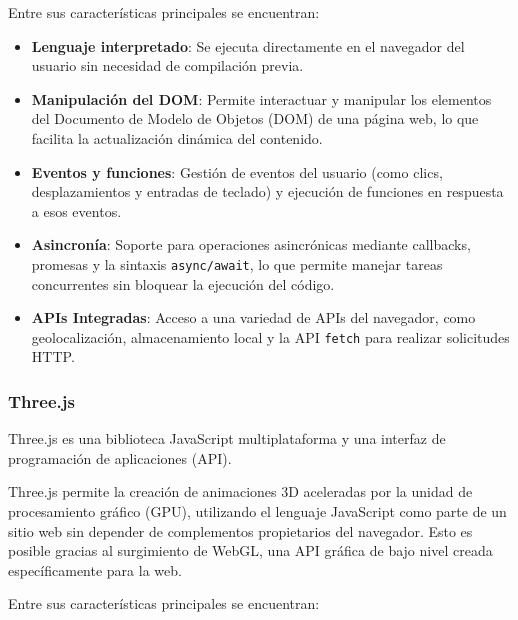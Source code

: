 \documentclass[a4paper, 12pt]{book}
\begin{document}
        Entre sus características principales se encuentran:
        \begin{itemize}
            \item \textbf{Lenguaje interpretado}: Se ejecuta directamente en el navegador del usuario sin necesidad de compilación previa.
            \item \textbf{Manipulación del DOM}: Permite interactuar y manipular los elementos del Documento de Modelo de Objetos (DOM) de una página web, lo que facilita la actualización dinámica del contenido.
            \item \textbf{Eventos y funciones}: Gestión de eventos del usuario (como clics, desplazamientos y entradas de teclado) y ejecución de funciones en respuesta a esos eventos.
            \item \textbf{Asincronía}: Soporte para operaciones asincrónicas mediante callbacks, promesas y la sintaxis \texttt{async/await}, lo que permite manejar tareas concurrentes sin bloquear la ejecución del código.
            \item \textbf{APIs Integradas}: Acceso a una variedad de APIs del navegador, como geolocalización, almacenamiento local y la API \texttt{fetch} para realizar solicitudes HTTP.
        \end{itemize}

        \subsubsection{Three.js}
        Three.js\cite{ThreeJS,dirksen2013learning,} es una biblioteca JavaScript multiplataforma y una interfaz de programación de aplicaciones (API).
        
        Three.js permite la creación de animaciones 3D aceleradas por la unidad de procesamiento gráfico (GPU), utilizando el lenguaje JavaScript como parte de un sitio web sin depender de complementos propietarios del navegador. Esto es posible gracias al surgimiento de WebGL, una API gráfica de bajo nivel creada específicamente para la web.\cite{ThreeJS}
        
        Entre sus características principales se encuentran:
\end{document}
